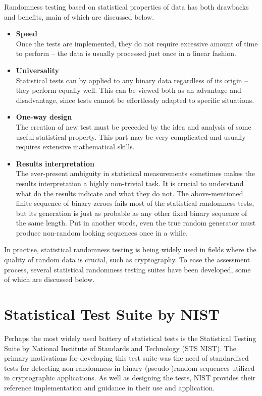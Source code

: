 \documentclass[12pt,oneside]{fithesis2}		%
\renewcommand{\_}{\leavevmode \kern0.0em\vbox{\hrule width0.4em}}
\newcommand{\squarebullet}{\textcolor{black}{\raisebox{0.15em}{\rule{4pt}{4pt}}}}
\newenvironment{myItemize}{
  \begin{itemize}[leftmargin=2em,rightmargin=1em,itemsep=\parskip ,parsep=0em,topsep=0em,partopsep=0em]
  \renewcommand{\labelitemi}{\squarebullet}
  \renewcommand{\labelitemii}{$\diamond$}
}{
  \end{itemize}
}
\begin{document}
Randomness testing based on statistical properties of data has both drawbacks and benefits, main of which are discussed below.
\begin{myItemize}
\item \textbf{Speed}\\
Once the tests are implemented, they do not require excessive amount of time to perform -- 
the data is usually processed just once in a linear fashion.
\item \textbf{Universality}\\
Statistical tests can by applied to any binary data regardless of its origin -- they perform equally well. 
This can be viewed both as an advantage and disadvantage, since tests cannot be effortlessly adapted to specific situations.
\item \textbf{One-way design}\\
The creation of new test must be preceded by the idea and analysis of some useful statistical property. This part may be 
very complicated and usually requires extensive mathematical skills.
\item \textbf{Results interpretation}\\
The ever-present ambiguity in statistical measurements sometimes makes the results interpretation a highly non-trivial task.
It is crucial to understand what do the results indicate and what they do not. The above-mentioned finite sequence of binary zeroes
fails most of the statistical randomness tests, but its generation is just as probable 
as any other fixed binary sequence of the same length.
Put in another words, even the true random generator must produce non-random looking sequences once in a while.
\end{myItemize}

\noindent
In practise, statistical randomness testing is being widely used in fields where the quality of random data is crucial, 
such as cryptography. To ease the assessment process, several statistical randomness testing suites have been developed, 
some of which are discussed below.

\section{Statistical Test Suite by NIST}
\label{sec:sts-nist}

Perhaps the most widely used battery of statistical tests is the Statistical Testing Suite 
by National Institute of Standards and Technology (STS NIST).
The primary motivations for developing this test suite was the need of standardised tests for detecting non-randomness 
in binary (pseudo-)random sequences utilized in cryptographic applications. As well as designing the tests,
NIST provides their reference implementation and guidance in their use and application. \parencite{sts-nist}
\end{document}
